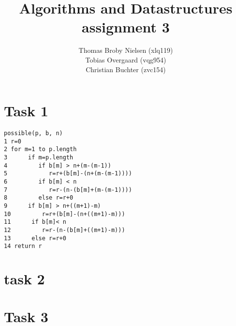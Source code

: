 \documentclass[12pt]{article}
\title{Algorithms and Datastructures assignment 3}
\author{Thomas Broby Nielsen (xlq119)\\ Tobias Overgaard (vqg954)\\ Christian Buchter (zvc154)}
\begin{document}
\maketitle

\tableofcontents

\pagebreak
\section{Task 1}
\begin{verbatim}
possible(p, b, n)
1 r=0
2 for m=1 to p.length
3      if m=p.length
4         if b[m] > n+(m-(m-1))
5            r=r+(b[m]-(n+(m-(m-1))))
6         if b[m] < n
7            r=r-(n-(b[m]+(m-(m-1))))
8         else r=r+0
9      if b[m] > n+((m+1)-m)
10         r=r+(b[m]-(n+((m+1)-m)))
11      if b[m]< n
12         r=r-(n-(b[m]+((m+1)-m)))
13      else r=r+0
14 return r
\end{verbatim}
\section{task 2}

\newpage
\section{Task 3}




\end{document}
